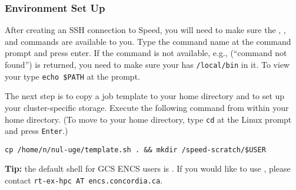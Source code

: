 \subsubsection{Environment Set Up}
\label{sect:envsetup}

After creating an SSH connection to Speed, you will need to
make sure the , , and 
commands are available to you. 
Type the command name at the command prompt and press enter.
If the command is not available, e.g., (``command not found'') is returned,
you need to make sure your  has \texttt{/local/bin} in it.
To view your  type \texttt{echo \$PATH} at the prompt.
%
%
%
%
%
%

The next step is to copy a job template to your home directory and to set up your
cluster-specific storage. Execute the following command from within your
home directory. (To move to your home directory, type \texttt{cd} at the Linux
prompt and press \texttt{Enter}.) 

\begin{verbatim}
cp /home/n/nul-uge/template.sh . && mkdir /speed-scratch/$USER
\end{verbatim}


\textbf{Tip:} the default shell for GCS ENCS users is .
If you would like to use , please contact 
\texttt{rt-ex-hpc AT encs.concordia.ca}.

